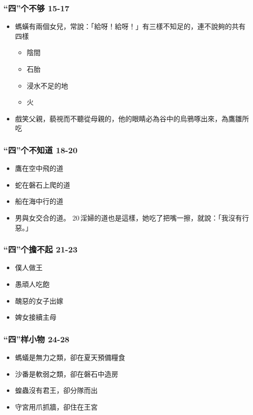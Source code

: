\subsubsection{“四”个不够 15-17}
\begin{itemize}
\itemsep-.45em 
\item 螞蟥有兩個女兒，常說：「給呀！給呀！」有三樣不知足的，連不說夠的共有四樣
\begin{itemize}
\itemsep-.45em 
\item 陰間
\item 石胎
\item 浸水不足的地
\item 火
\end{itemize}
\item 戲笑父親，藐視而不聽從母親的，他的眼睛必為谷中的烏鴉啄出來，為鷹雛所吃
\end{itemize}
\subsubsection{“四”个不知道 18-20}
\begin{itemize}
\itemsep-.45em 
\item 鷹在空中飛的道
\item 蛇在磐石上爬的道
\item 船在海中行的道
\item 男與女交合的道。 20 淫婦的道也是這樣，她吃了把嘴一擦，就說：「我沒有行惡。」
\end{itemize}
\subsubsection{“四”个擔不起 21-23}
\begin{itemize}
\itemsep-.45em 
\item 僕人做王
\item 愚頑人吃飽
\item 醜惡的女子出嫁
\item 婢女接續主母
\end{itemize}
\subsubsection{“四”样小物 24-28}
\begin{itemize}
\itemsep-.45em 
\item 螞蟻是無力之類，卻在夏天預備糧食
\item 沙番是軟弱之類，卻在磐石中造房
\item 蝗蟲沒有君王，卻分隊而出
\item 守宮用爪抓牆，卻住在王宮
\end{itemize}
